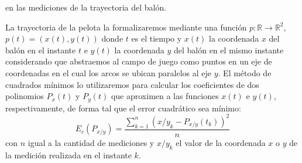 en las mediciones de la trayectoria del balón.
\par
La trayectoria de la pelota la formalizaremos mediante una función $p:\mathbb{R} \to \mathbb{R}^2$, $p(t) = (x(t),y(t))$ donde 
$t$ es el tiempo y $x(t)$ la coordenada $x$ del balón en el instante $t$ e $y(t)$ la coordenada $y$ del balón en el mismo instante considerando
que abstraemos al campo de juego como puntos en un eje de coordenadas en el cual los arcos se ubican paralelos al eje $y$.
El método de cuadrados mínimos\cite{burden}  lo utilizaremos para calcular los coeficientes de dos polinomios $P_x(t)$ y $P_y(t)$ que aproximen a las funciones 
$x(t)$ e $y(t)$, respectivamente, de forma tal que el error cuadrático sea mínimo:
\begin{displaymath}
  E_c(P_{x/y}) = \frac{\sum_{k=1}^{n}({x/y}_k-P_{x/y}(t_k))^2}{n} 
\end{displaymath}
con $n$ igual a la cantidad de mediciones y $x/y_k$ el valor de la coordenada $x$ o $y$ de la medición realizada en el instante $k$.

